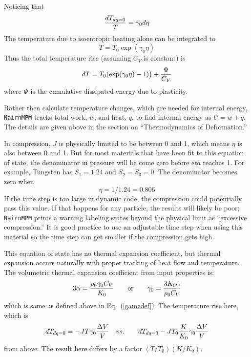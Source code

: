 \documentclass[11pt]{article}
\begin{document}
Noticing that
\begin{equation}
     {dT_{dq=0}\over T} =   \gamma_0  d\eta
\end{equation}
The temperature due to isoentropic heating alone can be integrated to
\begin{equation}
     T = T_0\exp( \gamma_0  \eta)
\end{equation}
Thus the total temperature rise (assuming $C_V$ is constant) is
\begin{equation}
      dT = T_0(\exp( \gamma_0  \eta)-1)\bigr) + {\Phi\over C_V}
\end{equation}
where $\Phi$ is the cumulative dissipated energy due to plasticity.

Rather then calculate temperature changes, which are needed for internal energy, {\tt NairnMPM} tracks total work, $w$, and heat, $q$, to find internal energy as $U = w+q$. The details are given above in the section on ``Thermodynamics of Deformation.''

In compression, $J$ is physically limited to be between 0 and 1, which means $\eta$ is also between 0 and 1. But for most materials that have been fit to this equation of state, the denominator in pressure will be come zero before $eta$ reaches 1. For example, Tungsten has $S_1=1.24$ and $S_2=S_3=0$. The denominator becomes zero when
\begin{equation}
     \eta = 1/1.24 = 0.806
\end{equation}
If the time step is too large in dynamic code, the compression could potentially pass this value. If that happens for any particle, the results will likely be poor; {\tt NairnMPM} prints a warning labeling states beyond the physical limit as ``excessive compression.'' It is good practice to use an adjustable time step when using this material so the time step can get smaller if the compression gets high.

This equation of state has no thermal expansion coefficient, but thermal expansion occurs naturally with proper tracking of heat flow and temperature. The volumetric thermal expansion coefficient from input properties is:
\begin{equation}
     3\alpha = {\rho_0 \gamma_0 C_V\over K_0} \qquad{\rm or}\qquad \gamma_0 = {3K_0\alpha\over \rho_0 C_V}
\end{equation}
which is same as defined above in Eq.~(\ref{gamzdef}). The temperature rise here, which is
\begin{equation}
     dT_{dq=0} = - J T\gamma_0 {\Delta V\over V}    \quad vs. \qquad  dT_{dq=0} -JT_0  {K\over K_0} \gamma_0 {\Delta V\over V}     \label{mgdt}
\end{equation}
from above. The result here differs by a factor $(T/T_0)(K/K_0)$.
\end{document}
